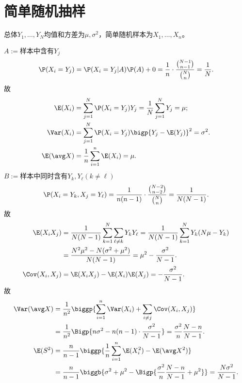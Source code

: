 \section{简单随机抽样}
\label{sec:simple random sampling}

总体$Y_1,\ldots,Y_N$均值和方差为$\mu,\sigma^2$，简单随机样本为$X_1,\ldots,X_n$。

$A:=$样本中含有$Y_j$
\[
	\P(X_i=Y_j)=\P(X_i=Y_j|A)\P(A)+0=\frac1n\cdot\frac{\binom{N-1}{n-1}}{\binom{N}{n}}=\frac1N.
\]
故
\begin{subequations}
	\begin{align}
		\E(X_i)&=\sum_{j=1}^N\P(X_i=Y_j)Y_j=\frac1N\sum_{j=1}^NY_j=\mu;\\
		\Var(X_i)&=\sum_{j=1}^N\P(X_i=Y_j)\bigp{Y_j-\E(Y_j)}^2=\sigma^2.\\
		\E(\avg X)&=\frac1n\sum_{i=1}^n\E(X_i)=\mu.
	\end{align}
\end{subequations}
$B:=$样本中同时含有$Y_k,Y_\ell(k\neq\ell)$
\[
	\P(X_i=Y_k,X_j=Y_\ell)=\frac1{n(n-1)}\cdot\frac{\binom{N-2}{n-2}}{\binom{N}{n}}=\frac1{N(N-1)}.
\]
故
\begin{align*}
	\E(X_iX_j)&=\frac1{N(N-1)}\sum_{k=1}^N\sum_{\ell\neq k}Y_kY_\ell=\frac1{N(N-1)}\sum_{k=1}^NY_k(N\mu-Y_k)\\
	&=\frac{N^2\mu^2-N(\sigma^2+\mu^2)}{N(N-1)}=\mu^2-\frac{\sigma^2}{N-1}.\\
	\Cov(X_i,X_j)&=\E(X_iX_j)-\E(X_i)\E(X_j)=-\frac{\sigma^2}{N-1}.
\end{align*}
故
\begin{align*}
	\Var(\avg X)&=\frac1{n^2}\biggp{\sum_{i=1}^n\Var(X_i)+\sum_{i\neq j}\Cov(X_i,X_j)}\\
	&=\frac1{n^2}\Bigp{n\sigma^2-n(n-1)\cdot\frac{\sigma^2}{N-1}}=\frac{\sigma^2}n\frac{N-n}{N-1}.\\
	\E(S^2)&=\frac n{n-1}\biggp{\frac1n\sum_{i=1}^n\E(X_i^2)-\E(\avg X^2)}\\
	&=\frac n{n-1}\biggb{\sigma^2+\mu^2-\Bigp{\frac{\sigma^2}n\frac{N-n}{N-1}+\mu^2}}=\frac{N\sigma^2}{N-1}.
\end{align*}
